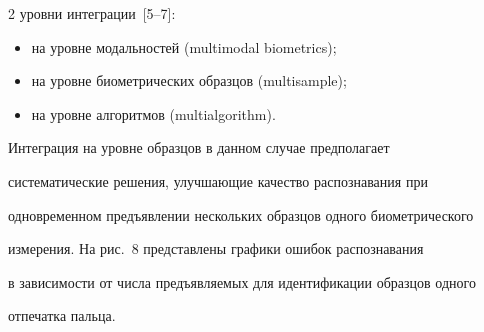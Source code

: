 \begin{multicols}{2}
уровни интеграции~\mbox{[5--7]:}

  \begin{itemize}

\item на уровне модальностей (multimodal biometrics);

\item на уровне биометрических образцов (multisample);

\item на уровне алгоритмов (multialgorithm).

  \end{itemize}

  

  Интеграция на уровне образцов в данном случае предполагает 

систематические решения, улуч\-ша\-ющие качество распознавания при 

одновременном предъявлении нескольких образцов одного био\-мет\-ри\-че\-ско\-го 

измерения. На рис.~8 представлены графики ошибок распознавания 

в зависимости от чис\-ла предъявляемых для идентификации образцов одного 

отпечатка пальца.



\end{multicols}



